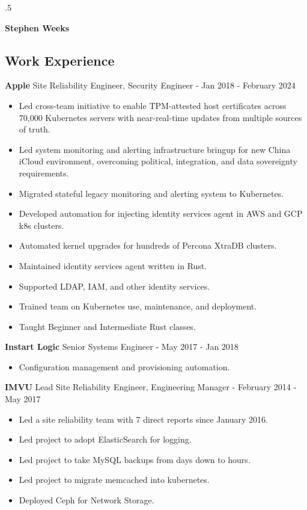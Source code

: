 \documentclass[line]{res}
\begin{document}
\moveleft.5\hoffset\centerline{\Huge\textbf{Stephen Weeks}}

\address{408.702.4448 tene@allalone.org}

\begin{resume}

\section{Work Experience}
\textbf{Apple} Site Reliability Engineer, Security Engineer - Jan 2018 - February 2024
\begin{itemize}
\item Led cross-team initiative to enable TPM-attested host certificates across 70,000 Kubernetes servers with near-real-time updates from multiple sources of truth.
\item Led system monitoring and alerting infrastructure bringup for new China iCloud environment, overcoming political, integration, and data sovereignty requirements.
\item Migrated stateful legacy monitoring and alerting system to Kubernetes.
\item Developed automation for injecting identity services agent in AWS and GCP k8s clusters.
\item Automated kernel upgrades for hundreds of Percona XtraDB clusters.
\item Maintained identity services agent written in Rust.
\item Supported LDAP, IAM, and other identity services.
\item Trained team on Kubernetes use, maintenance, and deployment.
\item Taught Beginner and Intermediate Rust classes.
\end{itemize}

\textbf{Instart Logic} Senior Systems Engineer - May 2017 - Jan 2018
\begin{itemize}
\item Configuration management and provisioning automation.
\end{itemize}

\textbf{IMVU} Lead Site Reliability Engineer, Engineering Manager - February 2014 - May 2017
\begin{itemize}
\item Led a site reliability team with 7 direct reports since January 2016.
\item Led project to adopt ElasticSearch for logging.
\item Led project to take MySQL backups from days down to hours.
\item Led project to migrate memcached into kubernetes.
\item Deployed Ceph for Network Storage.
\end{itemize}


\end{resume}
\end{document}
